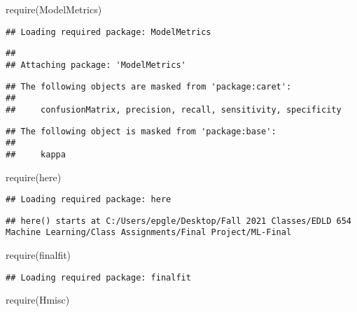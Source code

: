 \documentclass[
]{article}
\newenvironment{Shaded}{\begin{snugshade}}{\end{snugshade}}
\newcommand{\FunctionTok}[1]{\textcolor[rgb]{0.00,0.00,0.00}{#1}}
\newcommand{\NormalTok}[1]{#1}
\begin{document}
\begin{Shaded}
\begin{Highlighting}[]
  \FunctionTok{require}\NormalTok{(ModelMetrics)}
\end{Highlighting}
\end{Shaded}

\begin{verbatim}
## Loading required package: ModelMetrics
\end{verbatim}

\begin{verbatim}
## 
## Attaching package: 'ModelMetrics'
\end{verbatim}

\begin{verbatim}
## The following objects are masked from 'package:caret':
## 
##     confusionMatrix, precision, recall, sensitivity, specificity
\end{verbatim}

\begin{verbatim}
## The following object is masked from 'package:base':
## 
##     kappa
\end{verbatim}

\begin{Shaded}
\begin{Highlighting}[]
  \FunctionTok{require}\NormalTok{(here)}
\end{Highlighting}
\end{Shaded}

\begin{verbatim}
## Loading required package: here
\end{verbatim}

\begin{verbatim}
## here() starts at C:/Users/epgle/Desktop/Fall 2021 Classes/EDLD 654 Machine Learning/Class Assignments/Final Project/ML-Final
\end{verbatim}

\begin{Shaded}
\begin{Highlighting}[]
  \FunctionTok{require}\NormalTok{(finalfit)}
\end{Highlighting}
\end{Shaded}

\begin{verbatim}
## Loading required package: finalfit
\end{verbatim}

\begin{Shaded}
\begin{Highlighting}[]
  \FunctionTok{require}\NormalTok{(Hmisc)}
\end{Highlighting}
\end{Shaded}
\end{document}
